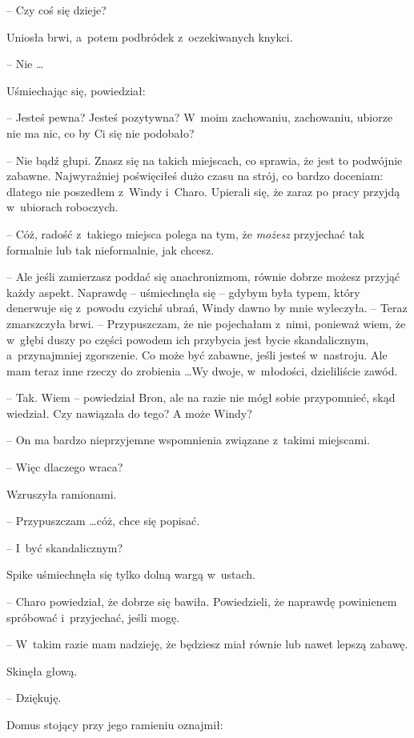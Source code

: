\documentclass[oneside,polish,11pt,rmheadings]{mwbk}
\begin{document}
-- Czy coś się dzieje? 

Uniosła brwi, a~potem podbródek z~oczekiwanych knykci. 

-- Nie  \ldots   

Uśmiechając się, powiedział: 

-- Jesteś pewna? Jesteś pozytywna? W~moim zachowaniu, zachowaniu, ubiorze nie ma nic, co by Ci się nie podobało? 

-- Nie bądź głupi. Znasz się na takich miejscach, co sprawia, że jest to podwójnie zabawne. Najwyraźniej poświęciłeś dużo czasu na strój, co bardzo doceniam: dlatego nie poszedłem z~Windy i~Charo. Upierali się, że zaraz po pracy przyjdą w~ubiorach roboczych. 

-- Cóż, radość z~takiego miejsca polega na tym, że \textit{możesz }przyjechać tak formalnie lub tak nieformalnie, jak chcesz. 

-- Ale jeśli zamierzasz poddać się anachronizmom, równie dobrze możesz przyjąć każdy aspekt. Naprawdę -- uśmiechnęła się -- gdybym była typem, który denerwuje się z~powodu czyichś ubrań, Windy dawno by mnie wyleczyła. -- Teraz zmarszczyła brwi. -- Przypuszczam, że nie pojechałam z~nimi, ponieważ wiem, że w~głębi duszy po części powodem ich przybycia jest bycie skandalicznym, a~przynajmniej zgorszenie. Co może być zabawne, jeśli jesteś w~nastroju. Ale mam teraz inne rzeczy do zrobienia \ldots  Wy dwoje, w~młodości, dzieliliście zawód. 

-- Tak. Wiem -- powiedział Bron, ale na razie nie mógł sobie przypomnieć, skąd wiedział. Czy nawiązała do tego? A może Windy? 

-- On ma bardzo nieprzyjemne wspomnienia związane z~takimi miejscami. 

-- Więc dlaczego wraca? 

Wzruszyła ramionami.

 -- Przypuszczam \ldots  cóż, chce się popisać. 

-- I~być skandalicznym? 

Spike uśmiechnęła się tylko dolną wargą w~ustach. 

-- Charo powiedział, że dobrze się bawiła. Powiedzieli, że naprawdę powinienem spróbować i~przyjechać, jeśli mogę. 

-- W~takim razie mam nadzieję, że będziesz miał równie lub nawet lepszą zabawę. 

Skinęła głową. 

-- Dziękuję. 

Domus stojący przy jego ramieniu oznajmił: 
\end{document}
